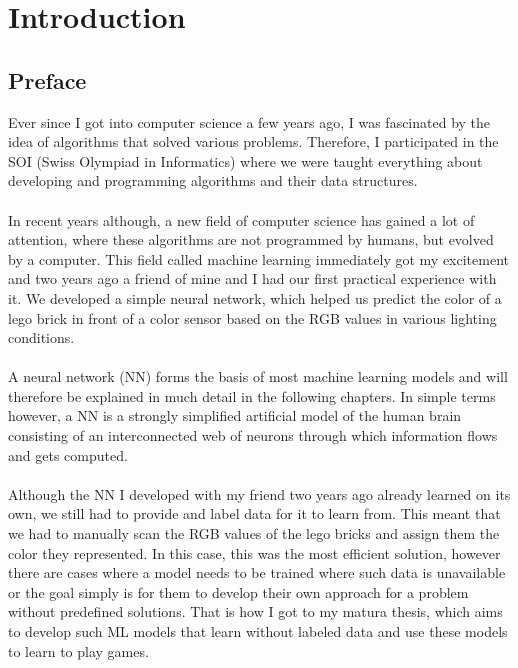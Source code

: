 \documentclass[12pt]{report}
\begin{document}
    \setcounter{page}{5}
    \tableofcontents

    \chapter{Introduction}\label{ch:introduction}


    \section{Preface}\label{sec:preface}
    Ever since I got into computer science a few years ago, I was fascinated by the idea of algorithms that solved various problems.
    Therefore, I participated in the SOI (Swiss Olympiad in Informatics) where we were taught everything about developing and programming algorithms and their data structures.
    \\ \\
    In recent years although, a new field of computer science has gained a lot of attention, where these algorithms are not programmed by humans, but evolved by a computer.
    This field called machine learning immediately got my excitement and two years ago a friend of mine and I had our first practical experience with it.
    We developed a simple neural network, which helped us predict the color of a lego brick in front of a color sensor based on the RGB values in various lighting conditions.
    \\ \\
    A neural network (NN) forms the basis of most machine learning models and will therefore be explained in much detail in the following chapters.
    In simple terms however, a NN is a strongly simplified artificial model of the human brain consisting of an interconnected web of neurons through which information flows and gets computed.
    \\ \\
    Although the NN I developed with my friend two years ago already learned on its own, we still had to provide and label data for it to learn from.
    This meant that we had to manually scan the RGB values of the lego bricks and assign them the color they represented.
    In this case, this was the most efficient solution, however there are cases where a model needs to be trained where such data is unavailable or the goal simply is for them to develop their own approach for a problem without predefined solutions.
    That is how I got to my matura thesis, which aims to develop such ML models that learn without labeled data and use these models to learn to play games.
\end{document}
